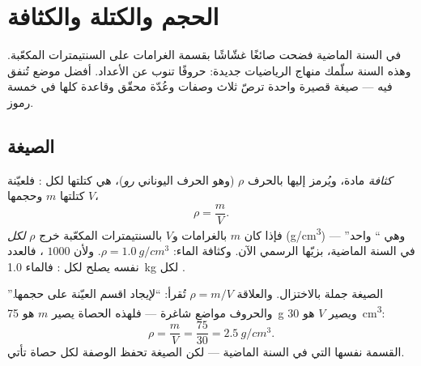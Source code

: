 \chapter{الحجم والكتلة والكثافة}\label{ch:g7:volume-mass-density}

في السنة الماضية فضحت صائغًا غشّاشًا بقسمة الغرامات على
السنتيمترات المكعّبة. وهذه السنة سلّمك منهاج الرياضيات 
جديدة: حروفًا تنوب عن الأعداد.  أفضل موضع تُنفق فيه
--- صيغة قصيرة واحدة ترصّ ثلاث وصفات وعُدّة محقّق وقاعدة 
كلها في خمسة رموز.

\section{الصيغة}

\begin{definition}\label{def:g7:volume-mass-density:formula}
\emph{كثافة} مادة، ويُرمز إليها بالحرف $\rho$ (وهو
الحرف اليوناني \emph{رو})، هي كتلتها لكل  : فلعيّنة
كتلتها $m$ وحجمها $V$،
\[
\rho = \frac{m}{V}.
\]
فإذا كان $m$ بالغرامات و$V$ بالسنتيمترات المكعّبة خرج $\rho$
\emph{ لكل } (\unit{g/cm^3}) --- وهي
``  واحد'' في السنة الماضية، بزيّها الرسمي
الآن. وكثافة الماء: $\rho = \qty{1.0}{g/cm^3}$. ولأن 
$1000$ ، فالعدد نفسه يصلح  لكل :
فالماء \qty{1.0}{kg} لكل .
\end{definition}

\begin{example}\label{ex:g7:volume-mass-density:reading}
الصيغة جملة بالاختزال. والعلاقة $\rho = m/V$ تُقرأ: ``لإيجاد 
اقسم  العيّنة على حجمها.'' والحروف مواضع شاغرة --- فلهذه
الحصاة يصير $m$ هو \qty{75}{g} ويصير $V$ هو \qty{30}{cm^3}:
\[
\rho = \frac{m}{V} = \frac{75}{30} = \qty{2.5}{g/cm^3}.
\]
القسمة نفسها التي في السنة الماضية --- لكن الصيغة تحفظ الوصفة
لكل حصاة تأتي.
\end{example}

